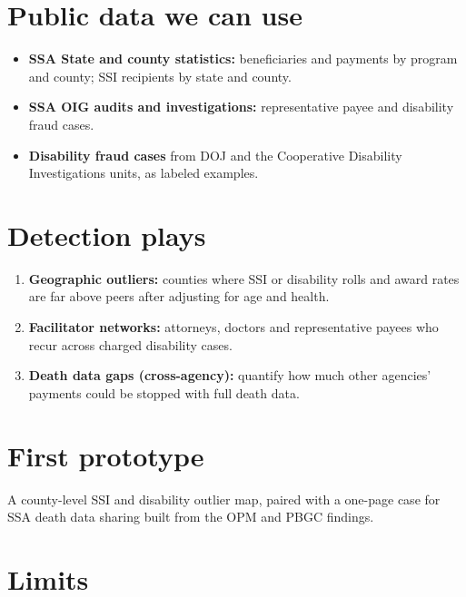 \documentclass[letterpaper,11pt]{article}
\providecommand{\tightlist}{\setlength{\itemsep}{0pt}\setlength{\parskip}{0pt}}
\begin{document}
\hypertarget{public-data-we-can-use}{%
\section{Public data we can use}\label{public-data-we-can-use}}

\begin{itemize}
\tightlist
\item
  \textbf{SSA State and county statistics:} beneficiaries and payments
  by program and county; SSI recipients by state and county.
\item
  \textbf{SSA OIG audits and investigations:} representative payee and
  disability fraud cases.
\item
  \textbf{Disability fraud cases} from DOJ and the Cooperative
  Disability Investigations units, as labeled examples.
\end{itemize}

\hypertarget{detection-plays}{%
\section{Detection plays}\label{detection-plays}}

\begin{enumerate}
\def\labelenumi{\arabic{enumi}.}
\tightlist
\item
  \textbf{Geographic outliers:} counties where SSI or disability rolls
  and award rates are far above peers after adjusting for age and
  health.
\item
  \textbf{Facilitator networks:} attorneys, doctors and representative
  payees who recur across charged disability cases.
\item
  \textbf{Death data gaps (cross-agency):} quantify how much other
  agencies' payments could be stopped with full death data.
\end{enumerate}

\hypertarget{first-prototype}{%
\section{First prototype}\label{first-prototype}}

A county-level SSI and disability outlier map, paired with a one-page
case for SSA death data sharing built from the OPM and PBGC findings.

\hypertarget{limits}{%
\section{Limits}\label{limits}}
\end{document}
